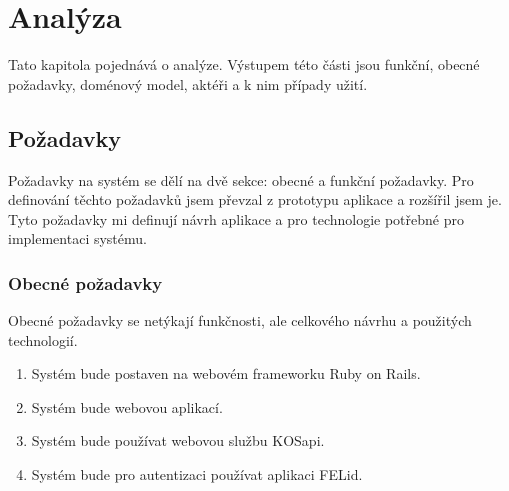 \chapter{Analýza}
Tato kapitola pojednává o analýze. Výstupem této části jsou funkční, obecné požadavky, doménový model, aktéři a k nim případy užití.

\section{Požadavky}
Požadavky na systém se dělí na dvě sekce: obecné a funkční požadavky. Pro definování těchto požadavků jsem převzal z prototypu aplikace \citep{prototyp_documentace} a rozšířil jsem je. Tyto požadavky mi definují návrh aplikace a pro technologie potřebné pro implementaci systému.

\subsection{Obecné požadavky}
Obecné požadavky se netýkají funkčnosti, ale celkového návrhu a použitých technologií.
\begin{enumerate}
\item Systém bude postaven na webovém frameworku Ruby on Rails.
\item Systém bude webovou aplikací.
\item Systém bude používat webovou službu KOSapi.
\item Systém bude pro autentizaci používat aplikaci FELid.
\end{enumerate}

